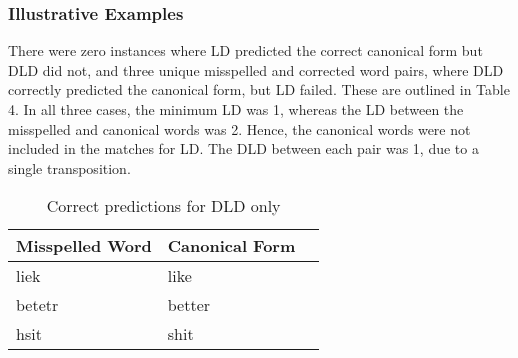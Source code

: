 \documentclass[11pt]{article}
\begin{document}
\subsubsection{Illustrative Examples}
There were zero instances where LD predicted the correct canonical form but DLD did not, and three unique misspelled and corrected word pairs, where DLD correctly predicted the canonical form, but LD failed. These are outlined in Table 4. In all three cases, the minimum LD was 1, whereas the LD between the misspelled and canonical words was 2. Hence, the canonical words were not included in the matches for LD. The DLD between each pair was 1, due to a single transposition.
\begin{table}
\begin{center}
\begin{tabular}{ |l|l|l| }
\hline
Misspelled Word & Canonical Form \\
\hline
liek & like\\
betetr & better\\ 
hsit & shit\\
\hline
\end{tabular}
\caption{Correct predictions for DLD only}\label{table4}
\end{center}
\end{table}
\\

\end{document}
